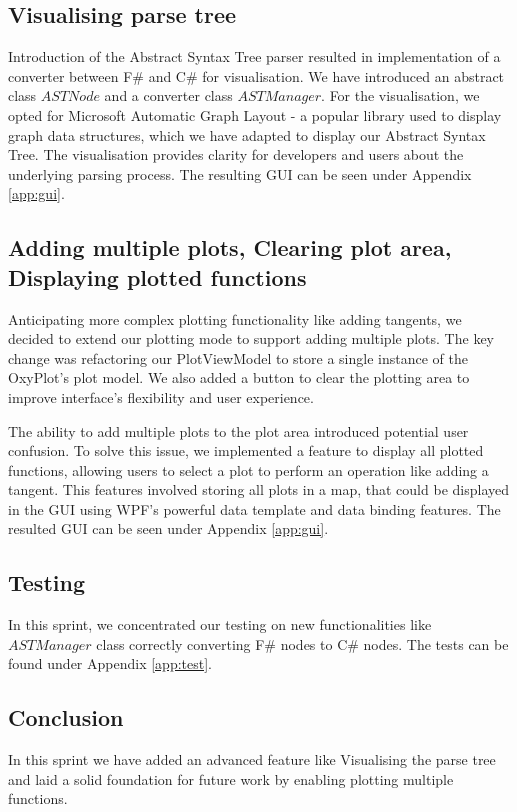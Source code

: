\documentclass[a4paper, oneside, 11pt]{report}
\begin{document}
\subsection{Visualising parse tree}
Introduction of the Abstract Syntax Tree parser resulted in implementation of a converter between F\# and C\# for visualisation. We have introduced an abstract class $ASTNode$ and a converter class $ASTManager$. For the visualisation, we opted for Microsoft Automatic Graph Layout\cite{MSAGL} - a popular library used to display graph data structures, which we have adapted to display our Abstract Syntax Tree. The visualisation provides clarity for developers and users about the underlying parsing process. The resulting GUI can be seen under Appendix \ref{app:gui}.

\subsection{Adding multiple plots, Clearing plot area, Displaying plotted functions}
Anticipating more complex plotting functionality like adding tangents, we decided to extend our plotting mode to support adding multiple plots. The key change was refactoring our PlotViewModel to store a single instance of the OxyPlot's plot model. We also added a button to clear the plotting area to improve interface's flexibility and user experience. 

The ability to add multiple plots to the plot area introduced potential user confusion. To solve this issue, we implemented a feature to display all plotted functions, allowing users to select a plot to perform an operation like adding a tangent. This features involved storing all plots in a map, that could be displayed in the GUI using WPF's powerful data template and data binding features. The resulted GUI can be seen under Appendix \ref{app:gui}.

\subsection{Testing}
In this sprint, we concentrated our testing on new functionalities like $ASTManager$ class correctly converting F\# nodes to C\# nodes. The tests can be found under Appendix \ref{app:test}.

\subsection{Conclusion}
In this sprint we have added an advanced feature like Visualising the parse tree and laid a solid foundation for future work by enabling plotting multiple functions.
\end{document}
